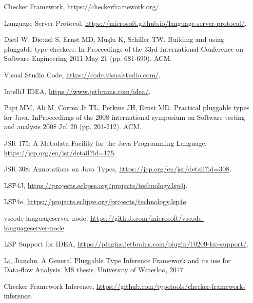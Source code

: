 \documentclass{article}
\begin{document}
\begin{thebibliography}{1}

 Checker Framework, \url{https://checkerframework.org/}.

 Language Server Protocol,
  \url{https://microsoft.github.io/language-server-protocol/}.

 Dietl W, Dietzel S, Ernst MD, Muşlu K, Schiller TW. Building
  and using pluggable type-checkers. In Proceedings of the 33rd International
  Conference on Software Engineering 2011 May 21 (pp. 681-690). ACM.

 Visual Studio Code, \url{https://code.visualstudio.com/}.

 IntelliJ IDEA, \url{https://www.jetbrains.com/idea/}.

 Papi MM, Ali M, Correa Jr TL, Perkins JH, Ernst MD. Practical
  pluggable types for Java. InProceedings of the 2008 international symposium on
  Software testing and analysis 2008 Jul 20 (pp. 201-212). ACM.

 JSR 175: A Metadata Facility for the Java Programming Language,
  \url{https://jcp.org/en/jsr/detail?id=175}.

 JSR 308: Annotations on Java Types,
  \url{https://jcp.org/en/jsr/detail?id=308}.

 LSP4J,
  \url{https://projects.eclipse.org/projects/technology.lsp4j}.

 LSP4e,
  \url{https://projects.eclipse.org/projects/technology.lsp4e}.

 vscode-languageserver-node,
  \url{https://github.com/microsoft/vscode-languageserver-node}.

 LSP Support for IDEA,
  \url{https://plugins.jetbrains.com/plugin/10209-lsp-support/}.

 Li, Jianchu. A General Pluggable Type Inference Framework and its
  use for Data-flow Analysis. MS thesis. University of Waterloo, 2017.

 Checker Framework Inference,
  \url{https://github.com/typetools/checker-framework-inference}.

\end{thebibliography}
\end{document}
